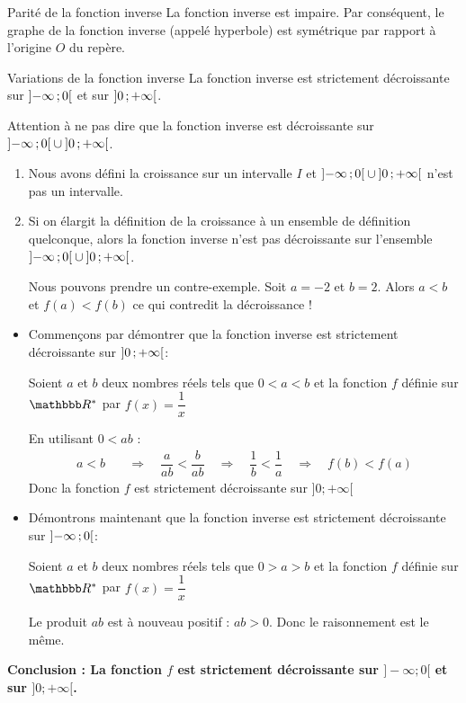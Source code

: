\documentclass[10pt,a4paper,openany,twoside]{book}
\begin{document}
	\begin{prop}{Parité de la fonction inverse}{}
		La fonction inverse est impaire. Par conséquent, le graphe de la fonction inverse (appelé hyperbole) est symétrique par rapport à l'origine $O$ du repère.
	\end{prop}

	\begin{prop}{Variations de la fonction inverse}{}
		La fonction inverse est strictement décroissante sur $\mathopen{]}-\infty\mathclose{}\mathpunct{};0\mathclose{[}$ et sur $\mathopen{]}0\mathclose{}\mathpunct{};+\infty\mathclose{[}$.
	\end{prop}

	\begin{rem}{}{}
		Attention à ne pas dire que la fonction inverse est décroissante sur $\mathopen{]}-\infty\mathclose{}\mathpunct{};0\mathclose{[} \cup \mathopen{]}0\mathclose{}\mathpunct{};+\infty\mathclose{[}$.
		\begin{enumerate}
			\item Nous avons défini la croissance sur un intervalle $I$ et $\mathopen{]}-\infty\mathclose{}\mathpunct{};0\mathclose{[} \cup \mathopen{]}0\mathclose{}\mathpunct{};+\infty\mathclose{[}$ n'est pas un intervalle.
			\item Si on élargit la définition de la croissance à un ensemble de définition quelconque, alors la fonction inverse n'est pas décroissante sur l'ensemble $\mathopen{]}-\infty\mathclose{}\mathpunct{};0\mathclose{[} \cup \mathopen{]}0\mathclose{}\mathpunct{};+\infty\mathclose{[}$.

			Nous pouvons prendre un contre-exemple. Soit $a=-2$ et $b=2$. Alors $a<b$ et $f(a)<f(b)$ ce qui contredit la décroissance !
		\end{enumerate}
	\end{rem}

	\begin{deme}{}{}
	\begin{itemize}
		\item Commençons par démontrer que la fonction inverse est strictement décroissante sur $\mathopen{]}0\mathclose{}\mathpunct{};+\infty\mathclose{[}$:

		Soient $a$ et $b$ deux nombres réels tels que $0<a<b$ et la fonction $f$ définie sur $\R^*$ par $f(x)=\dfrac{1}{x}$

		En utilisant $0<ab$ :
		\begin{align*}
			a<b \quad &\Longrightarrow \quad \dfrac{a}{ab} < \dfrac{b}{ab} \quad \Longrightarrow \quad \dfrac{1}{b} < \dfrac{1}{a}\quad \Longrightarrow \quad f(b) < f(a)
		\end{align*}
		Donc la fonction $f$ est strictement décroissante sur $]0;+\infty[$

		\item Démontrons maintenant que la fonction inverse est strictement décroissante sur $\mathopen{]}-\infty\mathclose{}\mathpunct{};0\mathclose{[}$:

		Soient $a$ et $b$ deux nombres réels tels que $0>a>b$ et la fonction $f$ définie sur $\R^*$ par $f(x)=\dfrac{1}{x}$

		Le produit $ab$ est à nouveau positif : $ab>0$. Donc le raisonnement est le même.
	\end{itemize}

	\bf{Conclusion :} La fonction $f$ est strictement décroissante sur $]-\infty;0[$ et sur $]0;+\infty[$.

	\end{deme}
\end{document}

